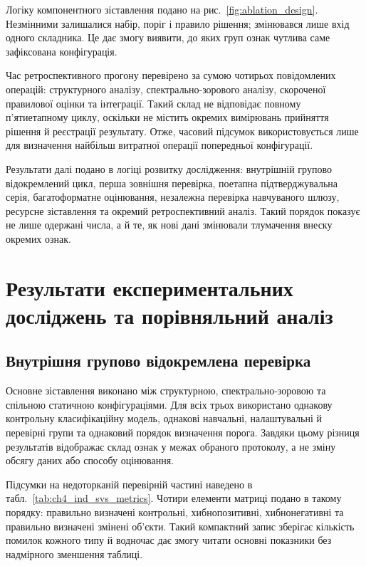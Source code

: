 Логіку компонентного зіставлення подано на рис.~\ref{fig:ablation_design}. Незмінними залишалися набір, поріг і правило рішення; змінювався лише вхід одного складника. Це дає змогу виявити, до яких груп ознак чутлива саме зафіксована конфігурація.



Час ретроспективного прогону перевірено за сумою чотирьох повідомлених операцій: структурного аналізу, спектрально-зорового аналізу, скороченої правилової оцінки та інтеграції. Такий склад не відповідає повному п’ятиетапному циклу, оскільки не містить окремих вимірювань прийняття рішення й реєстрації результату. Отже, часовий підсумок використовується лише для визначення найбільш витратної операції попередньої конфігурації.

Результати далі подано в логіці розвитку дослідження: внутрішній групово відокремлений цикл, перша зовнішня перевірка, поетапна підтверджувальна серія, багатоформатне оцінювання, незалежна перевірка навчуваного шлюзу, ресурсне зіставлення та окремий ретроспективний аналіз. Такий порядок показує не лише одержані числа, а й те, як нові дані змінювали тлумачення внеску окремих ознак.

\section{Результати експериментальних досліджень та порівняльний аналіз}
\label{sec:ch4_ind_svs}

\subsection{Внутрішня групово відокремлена перевірка}

Основне зіставлення виконано між структурною, спектрально-зоровою та спільною статичною конфігураціями. Для всіх трьох використано однакову контрольну класифікаційну модель, однакові навчальні, налаштувальні й перевірні групи та однаковий порядок визначення порога. Завдяки цьому різниця результатів відображає склад ознак у межах обраного протоколу, а не зміну обсягу даних або способу оцінювання.

Підсумки на недоторканій перевірній частині наведено в табл.~\ref{tab:ch4_ind_svs_metrics}. Чотири елементи матриці подано в такому порядку: правильно визначені контрольні, хибнопозитивні, хибнонегативні та правильно визначені змінені об’єкти. Такий компактний запис зберігає кількість помилок кожного типу й водночас дає змогу читати основні показники без надмірного зменшення таблиці.

